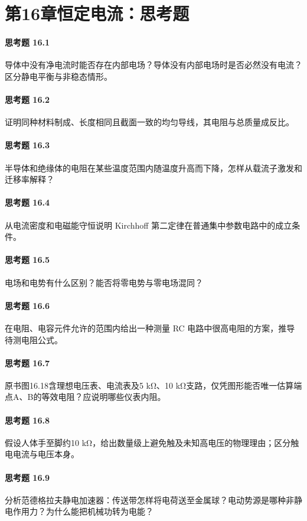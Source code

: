 \section*{第16章\quad 恒定电流：思考题}
\paragraph{思考题 16.1}
导体中没有净电流时能否存在内部电场？导体没有内部电场时是否必然没有电流？区分静电平衡与非稳态情形。

\paragraph{思考题 16.2}
证明同种材料制成、长度相同且截面一致的均匀导线，其电阻与总质量成反比。

\paragraph{思考题 16.3}
半导体和绝缘体的电阻在某些温度范围内随温度升高而下降，怎样从载流子激发和迁移率解释？

\paragraph{思考题 16.4}
从电流密度和电磁能守恒说明 Kirchhoff 第二定律在普通集中参数电路中的成立条件。

\paragraph{思考题 16.5}
电场和电势有什么区别？能否将零电势与零电场混同？

\paragraph{思考题 16.6}
在电阻、电容元件允许的范围内给出一种测量 RC 电路中很高电阻的方案，推导待测电阻公式。

\paragraph{思考题 16.7}
原书图16.18含理想电压表、电流表及5 kΩ、10 kΩ支路，仅凭图形能否唯一估算端点A、B的等效电阻？应说明哪些仪表内阻。

\paragraph{思考题 16.8}
假设人体手至脚约10 kΩ，给出数量级上避免触及未知高电压的物理理由；区分触电电流与电压本身。

\paragraph{思考题 16.9}
分析范德格拉夫静电加速器：传送带怎样将电荷送至金属球？电动势源是哪种非静电作用力？为什么能把机械功转为电能？
